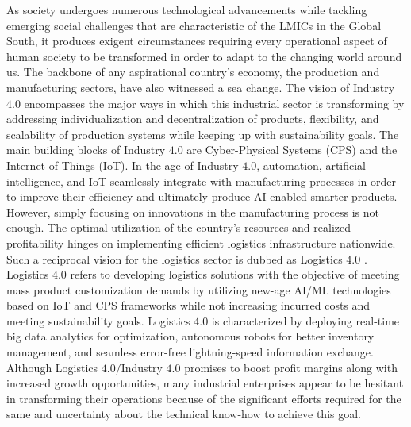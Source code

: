 \documentclass[paper=a4wide, fontsize=12pt]{scrartcl}
\begin{document}
As society undergoes numerous technological advancements while tackling emerging social challenges that are characteristic of the LMICs in the Global South, it produces exigent circumstances requiring every operational aspect of human society to be transformed in order to adapt to the changing world around us. The backbone of any aspirational country's economy, the production and manufacturing sectors, have also witnessed a sea change. The vision of Industry $4.0$ encompasses the major ways in which this industrial sector is transforming by addressing individualization and decentralization of products, flexibility, and scalability of production systems while keeping up with sustainability goals. The main building blocks of Industry $4.0$ are Cyber-Physical Systems (CPS) and the Internet of Things (IoT). In the age of Industry $4.0$, automation, artificial intelligence, and IoT seamlessly integrate with manufacturing processes in order to improve their efficiency and ultimately produce AI-enabled smarter products. \\

However, simply focusing on innovations in the manufacturing process is not enough. The optimal utilization of the country's resources and realized profitability hinges on implementing efficient logistics infrastructure nationwide. Such a reciprocal vision for the logistics sector is dubbed as Logistics $4.0$ \cite{Winkelhaus2019}. Logistics $4.0$ refers to developing logistics solutions with the objective of meeting mass product customization demands by utilizing new-age AI/ML technologies based on IoT and CPS frameworks while not increasing incurred costs and meeting sustainability goals. Logistics $4.0$ is characterized by deploying real-time big data analytics for optimization, autonomous robots for better inventory management, and seamless error-free lightning-speed information exchange. Although Logistics $4.0/$Industry $4.0$ promises to boost profit margins along with increased growth opportunities, many industrial enterprises appear to be hesitant in transforming their operations because of the significant efforts required for the same and uncertainty about the technical know-how to achieve this goal. \\
\end{document}
